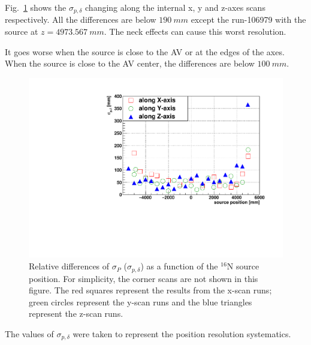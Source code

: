 Fig.~\ref{pos_relative_sigma_biasesVsPositions} shows the $\sigma_{p,\delta}$ changing along the internal x, y and z-axes scans respectively. All the differences are below $190~mm$ except the run-106979 with the source at $z=4973.567~mm$. The neck effects can cause this worst resolution. 

It goes worse when the source is close to the AV or at the edges of the axes. When the source is close to the AV center, the differences are below $100~mm$.

\begin{figure}[!htb]
	\centering
	\includegraphics[width=16cm]{N16_6176_pos_sigmaP_data_mc.pdf}
	\caption{Relative differences of $\sigma_P$ ($\sigma_{p,\delta}$) as a function of the $^{16}$N source position. For simplicity, the corner scans are not shown in this figure. The red squares represent the results from the x-scan runs; green circles represent the y-scan runs and the blue triangles represent the z-scan runs.}
	\label{pos_relative_sigma_biasesVsPositions}
\end{figure}

The values of $\sigma_{p,\delta}$ were taken to represent the position resolution systematics.

